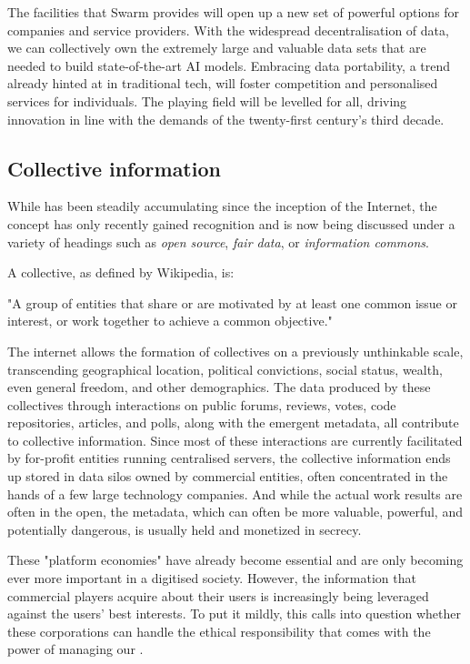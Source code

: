 The facilities that Swarm provides will open up a new set of powerful options for companies and service providers. With the widespread decentralisation of data, we can collectively own the extremely large and valuable data sets that are needed to build state-of-the-art AI models. Embracing data portability, a trend already hinted at in traditional tech, will foster competition and personalised services for individuals. The playing field will be levelled for all, driving innovation in line with the demands of the twenty-first century's third decade. 



\subsection{Collective information \statusgreen}\label{sec:collective_information}

While  has been steadily accumulating since the inception of the Internet, the concept has only recently gained recognition and is now being discussed under a variety of headings such as \emph{open source}, \emph{fair data}, or \emph{information commons}.

A collective, as defined by Wikipedia, is:
\begin{displayquote}
"A group of entities that share or are motivated by at least one common issue or interest, or work together to achieve a common objective." 
\end{displayquote}
The internet allows the formation of collectives on a previously unthinkable scale, transcending geographical location, political convictions, social status, wealth, even general freedom, and other demographics. The data produced by these collectives through interactions on public forums, reviews, votes, code repositories, articles, and polls, along with the emergent metadata, all contribute to collective information. Since most of these interactions are currently facilitated by for-profit entities running centralised servers, the collective information ends up stored in data silos owned by commercial entities, often concentrated in the hands of a few large technology companies. And while the actual work results are often in the open, the metadata, which can often be more valuable, powerful, and potentially dangerous, is usually held and monetized in secrecy.

These "platform economies" have already become essential and are only becoming ever more important in a digitised society. However, the information that commercial players acquire about their users is increasingly being leveraged against the users' best interests. To put it mildly, this calls into question whether these corporations can handle the ethical responsibility that comes with the power of managing our .

